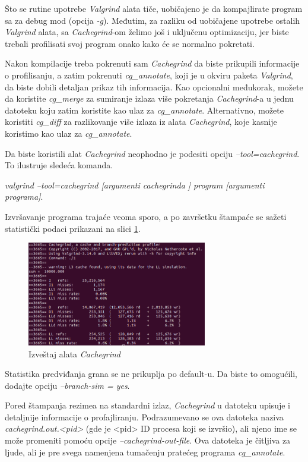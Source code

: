\documentclass[12pt,oneside]{memoir}
\theoremstyle{plain}
\theoremstyle{definition}
\begin{document}
Što se rutine upotrebe \textit{Valgrind} alata tiče, uobičajeno je da kompajlirate program sa za debug mod (opcija \textit{-g}). Međutim, za razliku od uobičajene upotrebe ostalih \textit{Valgrind} alata, sa \textit{Cachegrind}-om želimo još i uključenu optimizaciju, jer biste trebali profilisati svoj program onako kako će se normalno pokretati. 

Nakon kompilacije treba pokrenuti sam \textit{Cachegrind} da biste prikupili informacije o profilisanju, a zatim pokrenuti \textit{cg\_annotate}, koji je u okviru paketa \textit{Valgrind}, da biste dobili detaljan prikaz tih informacija. Kao opcionalni međukorak, možete da koristite \textit{cg\_merge} za sumiranje izlaza više pokretanja \textit{Cachegrind}-a u jednu datoteku koju zatim koristite kao ulaz za \textit{cg\_annotate}. Alternativno, možete koristiti \textit{cg\_diff} za razlikovanje više izlaza iz alata \textit{Cachegrind}, koje kasnije koristimo kao ulaz za \textit{cg\_annotate}.

Da biste koristili alat \textit{Cachegrind} neophodno je podesiti opciju \textit{–tool=cachegrind}. To ilustruje sledeća komanda. 
\begin{center}
\textit{valgrind --tool=cachegrind [argumenti cachegrinda ] program [argumenti programa]}.
\end{center}

Izvršavanje programa trajaće veoma sporo, a po završetku štampaće se sažeti statistički podaci prikazani na slici \ref{fig:slika2.15}.
\begin{figure}[!ht]
  \centering
  \includegraphics[width=0.7\textwidth]{CachegrindReport.png}
  \caption{Izveštaj alata \textit{Cachegrind}}
  \label{fig:slika2.15}
\end{figure}
Statistika predviđanja grana se ne prikuplja po default-u. Da biste to omogućili, dodajte opciju \textit{--branch-sim = yes}.

Pored štampanja rezimea na standardni izlaz, \textit{Cachegrind} u datoteku upisuje i detaljnije informacije o profajliranju. Podrazumevano se ova datoteka naziva \textit{cachegrind.out.<pid>} (gde je <pid> ID procesa koji se izvršio), ali njeno ime se može promeniti pomoću opcije \textit{--cachegrind-out-file}. Ova datoteka je čitljiva za ljude, ali je pre svega namenjena tumačenju pratećeg programa \textit{cg\_annotate}.
\end{document}
